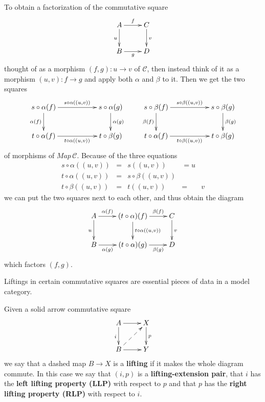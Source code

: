 To obtain a factorization of the commutative square
\begin{displaymath}
\xymatrix{
A \ar[d]_u \ar[r]^f & C \ar[d]^v \\
B \ar[r]_g & D
}
\end{displaymath}
thought of as a morphism $(f,g):u\to v$ of $\mathscr{C}$, then instead think of it as a morphism $(u,v):f\to g$ and apply both $\alpha$ and $\beta$ to it. Then we get the two squares
\begin{displaymath}
\xymatrix{
s\circ \alpha (f) \ar[d]_{\alpha (f)} \ar[rr]^{s\circ \alpha ((u,v))} && s\circ \alpha (g) \ar[d]^{\alpha (g)} & s\circ \beta (f) \ar[d]_{\beta (f)} \ar[rr]^{s\circ \beta ((u,v))} && s\circ \beta (g) \ar[d]^{\beta (g)} \\
t\circ \alpha (f) \ar[rr]_{t\circ \alpha ((u,v))} && t\circ \beta (g) & t\circ \alpha (f) \ar[rr]_{t\circ \beta ((u,v))} && t\circ \beta (g)
}
\end{displaymath}
of morphisms of $Map\, \mathscr{C}$. Because of the three equations
\begin{displaymath}
\begin{array}{lcccl}
s\circ \alpha ((u,v)) & = & s((u,v)) & = u \\
t\circ \alpha ((u,v)) & = & s\circ \beta ((u,v)) \\
t\circ \beta ((u,v)) & = & t((u,v)) & = & v
\end{array}
\end{displaymath}
we can put the two squares next to each other, and thus obtain the diagram
\begin{displaymath}
\xymatrix{
A \ar[d]_u \ar[r]^(.35){\alpha (f)} & (t\circ \alpha )(f) \ar[d]^{t\circ \alpha ((u,v))} \ar[r]^(.65){\beta (f)} & C \ar[d]^v \\
B \ar[r]_(.35){\alpha (g)} & (t\circ \alpha )(g) \ar[r]_(.65){\beta (g)} & D
}
\end{displaymath}
which factors $(f,g)$.

Liftings in certain commutative squares are essential pieces of data in a model category.
\begin{definition}
Given a solid arrow commutative square
\begin{displaymath}
\xymatrix{
A \ar[d]_i \ar[r] & X \ar[d]^p \\
B \ar[r] \ar@{-->}[ur] & Y
}
\end{displaymath}
we say that a dashed map $B\to X$ is a \textbf{lifting} if it makes the whole diagram commute. In this case we say that $(i,p)$ is a \textbf{lifting-extension pair}, that $i$ has the \textbf{left lifting property (LLP)} with respect to $p$ and that $p$ has the \textbf{right lifting property (RLP)} with respect to $i$.
\end{definition}



